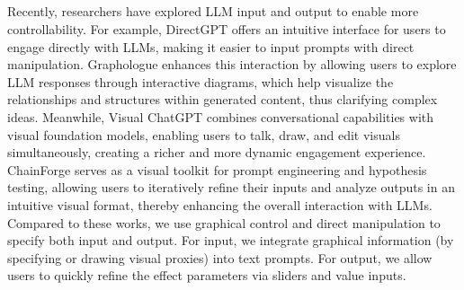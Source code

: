 \subsection{}
Recently, researchers have explored 
LLM input and output to enable more controllability. For example, DirectGPT \cite{masson2024directgpt} offers an intuitive interface for users to engage directly with {LLMs}, %
making it easier to input prompts with direct manipulation.  Graphologue \cite{jiang2023graphologue} enhances this interaction by allowing users to explore LLM responses through interactive diagrams, which help visualize the relationships and structures within generated content, thus clarifying complex ideas. Meanwhile, Visual ChatGPT \cite{wu2023visual} combines conversational capabilities with visual foundation models, enabling users to talk, draw, and edit visuals simultaneously, creating a richer and more dynamic engagement experience. ChainForge \cite{arawjo2023chainforge} serves as a visual toolkit for prompt engineering and hypothesis testing, allowing users to iteratively refine their inputs and analyze outputs in an intuitive visual format, thereby enhancing the overall interaction with LLMs. Compared to these works, we {use graphical control and direct manipulation to specify both input and output}.
For input, we integrate graphical information {(}by specifying or drawing visual proxies{)} into text prompts. For output, we allow users to quickly refine the effect parameters via sliders and value inputs.

